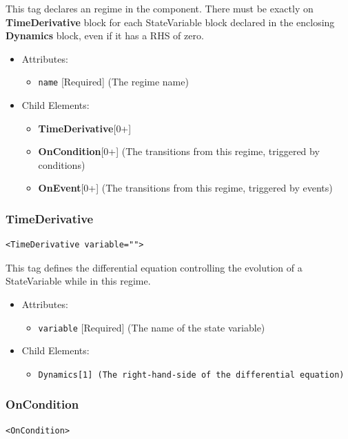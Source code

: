 \documentclass{article}
\newcommand{\Dynamics}{{\bf{Dynamics}}\xspace}
\newcommand{\MathInline}{\tt{Dynamics}}
\newcommand{\TimeDerivative}{{\bf{TimeDerivative}}\xspace}
\newcommand{\OnEvent}{{\bf{OnEvent}}\xspace}
\newcommand{\OnCondition}{{\bf{OnCondition}}\xspace}
\begin{document}
This tag declares an regime in the component. There must be exactly on
\TimeDerivative block for each StateVariable block declared in the
enclosing \Dynamics block, even if it has a RHS of zero.

\begin{itemize}
\item Attributes:
\begin{itemize}
\item \verb|name| {[}Required{]} (The regime name)
\end{itemize}

\item Child Elements:
\begin{itemize}
\item \TimeDerivative {[}0+{]}
\item \OnCondition {[}0+{]} (The transitions from this regime, triggered by
conditions)
\item \OnEvent {[}0+{]} (The transitions from this regime, triggered by events)
\end{itemize}

\end{itemize}

\subsubsection{TimeDerivative}
%
\begin{lstlisting}
<TimeDerivative variable="">
\end{lstlisting}

This tag defines the differential equation controlling the evolution of a
StateVariable while
in this regime.

\begin{itemize}
\item Attributes:
%
\begin{itemize}
\item \verb|variable| {[}Required{]} (The name of the state variable)
\end{itemize}

\item Child Elements:
%
\begin{itemize}
\item \MathInline {[}1{]} (The right-hand-side of the differential equation)
\end{itemize}
\end{itemize}

\subsubsection{OnCondition}
%
\begin{lstlisting}
<OnCondition>
\end{lstlisting}
\end{document}
